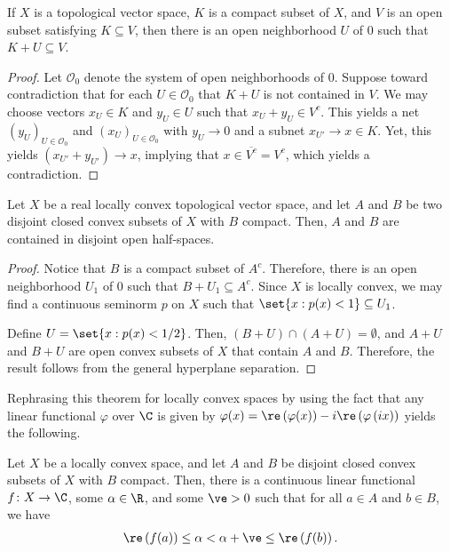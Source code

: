 \documentclass[10pt]{mypackage}
\begin{document}
\begin{lemma}
  If $X$ is a topological vector space, $K$ is a compact subset of $X$, and $V$ is an open subset satisfying $K\subseteq V$, then there is an open neighborhood $U$ of $0$ such that $K + U \subseteq V$.
\end{lemma}
\begin{proof}
  Let $ \mathcal{O}_0 $  denote the system of open neighborhoods of $0$. Suppose toward contradiction that for each $U\in \mathcal{O}_0$ that $K + U$ is not contained in $V$. We may choose vectors $x_U\in K$ and $y_U\in U$ such that $x_U + y_U\in V^{c}$. This yields a net $\left( y_U \right)_{U\in \mathcal{O}_0}$ and $\left( x_U \right)_{U\in \mathcal{O}_0}$ with $y_U\rightarrow 0$ and a subnet $x_{U'}\rightarrow x\in K$. Yet, this yields $\left( x_{U'} + y_{U'} \right)\rightarrow x$, implying that $x\in \overline{V^c} = V^c$, which yields a contradiction.
\end{proof}
\begin{theorem}
  Let $X$ be a real locally convex topological vector space, and let $A$ and $B$ be two disjoint closed convex subsets of $X$ with $B$ compact. Then, $A$ and $B$ are contained in disjoint open half-spaces.
\end{theorem}
\begin{proof}
  Notice that $B$ is a compact subset of $A^{c}$. Therefore, there is an open neighborhood $U_1$ of $0$ such that $B + U_1\subseteq A^{c}$. Since $X$ is locally convex, we may find a continuous seminorm $p$ on $X$ such that $\set{x : p(x) < 1}\subseteq U_1$.

  Define $U = \set{x : p(x) < 1/2}$. Then, $\left( B + U \right) \cap \left( A + U \right) = \emptyset$, and $A + U$ and $B + U$ are open convex subsets of $X$ that contain $A$ and $B$. Therefore, the result follows from the general hyperplane separation.
\end{proof}
Rephrasing this theorem for locally convex spaces by using the fact that any linear functional $\varphi$ over $\C$ is given by $\varphi(x) = \re\left( \varphi(x) \right) - i\re\left( \varphi\left( ix \right) \right)$ yields the following.
\begin{theorem}
  Let $X$ be a locally convex space, and let $A$ and $B$ be disjoint closed convex subsets of $X$ with $B$ compact. Then, there is a continuous linear functional $f\colon X\rightarrow \C$, some $\alpha\in \R$, and some $\ve > 0$ such that for all $a\in A$ and $b\in B$, we have
  \begin{align*}
    \re\left( f(a) \right)\leq \alpha < \alpha + \ve \leq \re\left( f(b) \right).
  \end{align*}
\end{theorem}
\end{document}
